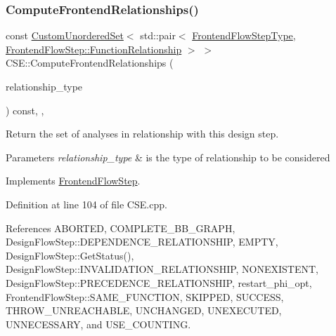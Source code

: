 \subsubsection{\texorpdfstring{Compute\+Frontend\+Relationships()}{ComputeFrontendRelationships()}}
{\footnotesize\ttfamily const \hyperlink{classCustomUnorderedSet}{Custom\+Unordered\+Set}$<$ std\+::pair$<$ \hyperlink{frontend__flow__step_8hpp_afeb3716c693d2b2e4ed3e6d04c3b63bb}{Frontend\+Flow\+Step\+Type}, \hyperlink{classFrontendFlowStep_af7cf30f2023e5b99e637dc2058289ab0}{Frontend\+Flow\+Step\+::\+Function\+Relationship} $>$ $>$ C\+S\+E\+::\+Compute\+Frontend\+Relationships (\begin{DoxyParamCaption}\item[{const \hyperlink{classDesignFlowStep_a723a3baf19ff2ceb77bc13e099d0b1b7}{Design\+Flow\+Step\+::\+Relationship\+Type}}]{relationship\+\_\+type }\end{DoxyParamCaption}) const\hspace{0.3cm}{\ttfamily [override]}, {\ttfamily [private]}, {\ttfamily [virtual]}}



Return the set of analyses in relationship with this design step. 


\begin{DoxyParams}{Parameters}
{\em relationship\+\_\+type} & is the type of relationship to be considered \\
\hline
\end{DoxyParams}


Implements \hyperlink{classFrontendFlowStep_abeaff70b59734e462d347ed343dd700d}{Frontend\+Flow\+Step}.



Definition at line 104 of file C\+S\+E.\+cpp.



References A\+B\+O\+R\+T\+ED, C\+O\+M\+P\+L\+E\+T\+E\+\_\+\+B\+B\+\_\+\+G\+R\+A\+PH, Design\+Flow\+Step\+::\+D\+E\+P\+E\+N\+D\+E\+N\+C\+E\+\_\+\+R\+E\+L\+A\+T\+I\+O\+N\+S\+H\+IP, E\+M\+P\+TY, Design\+Flow\+Step\+::\+Get\+Status(), Design\+Flow\+Step\+::\+I\+N\+V\+A\+L\+I\+D\+A\+T\+I\+O\+N\+\_\+\+R\+E\+L\+A\+T\+I\+O\+N\+S\+H\+IP, N\+O\+N\+E\+X\+I\+S\+T\+E\+NT, Design\+Flow\+Step\+::\+P\+R\+E\+C\+E\+D\+E\+N\+C\+E\+\_\+\+R\+E\+L\+A\+T\+I\+O\+N\+S\+H\+IP, restart\+\_\+phi\+\_\+opt, Frontend\+Flow\+Step\+::\+S\+A\+M\+E\+\_\+\+F\+U\+N\+C\+T\+I\+ON, S\+K\+I\+P\+P\+ED, S\+U\+C\+C\+E\+SS, T\+H\+R\+O\+W\+\_\+\+U\+N\+R\+E\+A\+C\+H\+A\+B\+LE, U\+N\+C\+H\+A\+N\+G\+ED, U\+N\+E\+X\+E\+C\+U\+T\+ED, U\+N\+N\+E\+C\+E\+S\+S\+A\+RY, and U\+S\+E\+\_\+\+C\+O\+U\+N\+T\+I\+NG.

